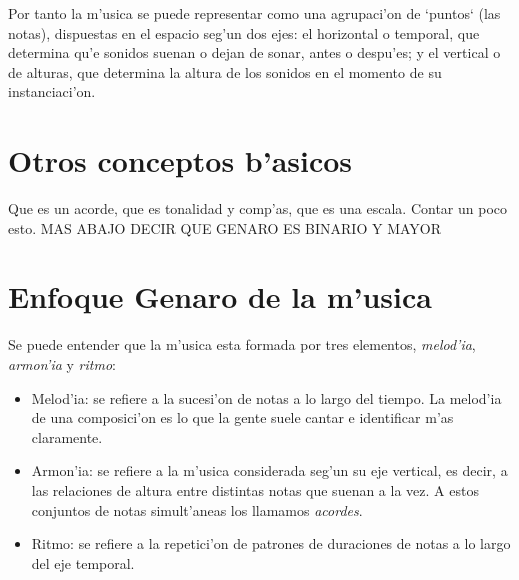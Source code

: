 \documentclass[a4paper,12pt]{article}
\begin{document}
Por tanto la m'usica se puede representar como una agrupaci'on de `puntos` (las notas), dispuestas en el espacio seg'un dos ejes: el horizontal o temporal, que determina qu'e sonidos suenan o dejan de sonar, antes o despu'es; y el vertical o de alturas, que determina la altura de los sonidos en el momento de su instanciaci'on.

\section{Otros conceptos b'asicos}
Que es un acorde, que es tonalidad y comp'as, que es una escala. Contar un poco esto. MAS ABAJO DECIR QUE GENARO ES BINARIO Y MAYOR

\section{Enfoque Genaro de la m'usica}
Se puede entender que la m'usica esta formada por tres elementos, \emph{melod'ia}, \emph{armon'ia} y \emph{ritmo}:
\begin{itemize}
\item Melod'ia: se refiere a la sucesi'on de notas a lo largo del tiempo. La melod'ia de una composici'on es lo que la gente suele cantar e identificar m'as claramente.
\item Armon'ia: se refiere a la m'usica considerada seg'un su eje vertical, es decir, a las relaciones de altura entre distintas notas que suenan a la vez. A estos conjuntos de notas simult'aneas los llamamos \emph{acordes}.
\item Ritmo: se refiere a la repetici'on de patrones de duraciones de notas a lo largo del eje temporal.
\end{itemize}
\end{document}
